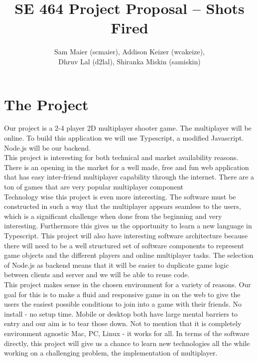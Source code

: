 \documentclass[11pt, oneside]{article}   	%
\title{SE 464 Project Proposal -- Shots Fired}
\author{Sam Maier (scmaier), Addison Keizer (wcakeize), \\Dhruv Lal (d2lal), Shiranka Miskin (samiskin)}
\begin{document}
\maketitle
\section{The Project}
\hspace*{5mm} Our project is a 2-4 player 2D multiplayer shooter game. The multiplayer will be online. To build this application we will use Typescript, a modified Javascript. Node.js will be our backend. \\

This project is interesting for both technical and market availability reasons. There is an opening in the market for a well made, free and fun web application that has easy inter-friend multiplayer capability through the internet. There are a ton of games that are very popular multiplayer component   \\

Technology wise this project is even more interesting. The software must be constructed in such a way that the multiplayer appears seamless to the users, which is a significant challenge when done from the beginning and very interesting. Furthermore this gives us the opportunity to learn a new language in Typescript. This project will also have interesting software architecture because there will need to be a well structured set of software components to represent game objects and the different players and online multiplayer tasks. The selection of Node.js as backend means that it will be easier to duplicate game logic between clients and server and we will be able to reuse code. \\

This project makes sense in the chosen environment for a variety of reasons. Our goal for this is to make a fluid and responsive game in on the web to give the users the easiest possible conditions to join into a game with their friends. No install - no setup time. Mobile or desktop both have large mental barriers to entry and our aim is to tear those down. Not to mention that it is completely environment agnostic Mac, PC, Linux - it works for all. In terms of the software directly, this project will give us a chance to learn new technologies all the while working on a challenging problem, the implementation of multiplayer.
\end{document}
